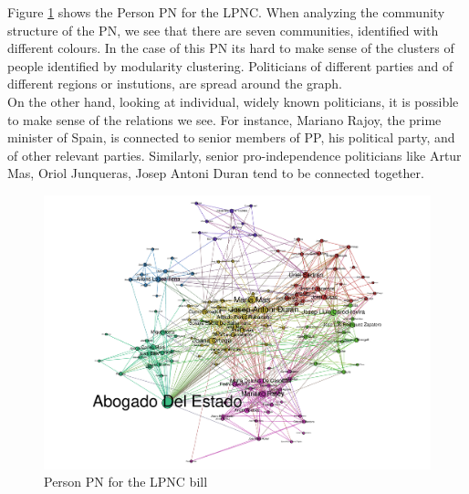 Figure \ref{fig:00102014-persons} shows the Person PN for the LPNC. When analyzing the community structure of the PN, we see that there are seven communities, identified with different colours. In the case of this PN its hard to make sense of the clusters of people identified by modularity clustering. Politicians of different parties and of different regions or instutions, are spread around the graph. \\

On the other hand, looking at individual, widely known politicians, it is possible to make sense of the relations we see. For instance, Mariano Rajoy, the prime minister of Spain, is connected to senior members of PP, his political party, and of other relevant parties. Similarly, senior pro-independence politicians like Artur Mas, Oriol Junqueras, Josep Antoni Duran tend to be connected together. \\

\begin{figure}[H]
    \centering
    \includegraphics[width=1\textwidth,scale=1.3]{figs/00102014-persons}
    \caption{Person PN for the LPNC bill}
    \label{fig:00102014-persons}
\end{figure}



